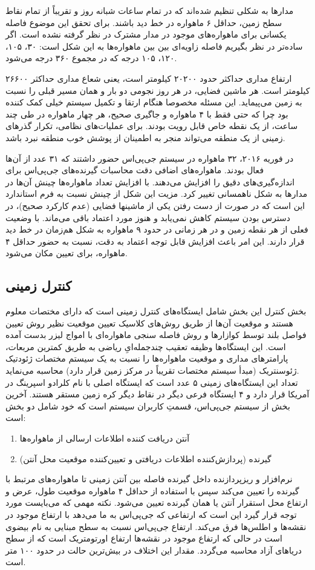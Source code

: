 مدارها به شکلی تنظیم شده‌اند که در تمام ساعات شبانه روز و تقریباً از تمام نقاط سطح زمین، حداقل ۶ ماهواره در خط دید باشند. برای تحقق این موضوع فاصله یکسانی برای ماهواره‌های موجود در مدار مشترک در نظر گرفته نشده‌ است. اگر ساده‌تر در نظر بگیریم فاصله زاویه‌ای بین بین ماهواره‌ها به این شکل است: ۳۰،  ۱۰۵،  ۱۲۰،  ۱۰۵ درجه که در مجموع ۳۶۰ درجه می‌شود.


ارتفاع مداری حداکثر حدود ۲۰۲۰۰ کیلومتر است، یعنی شعاع مداری حداکثر ۲۶۶۰۰ کیلومتر است. هر ماشین فضایی، در هر روز نجومی دو بار و همان مسیر قبلی را نسبت به زمین می‌پیماید. این مسئله مخصوصا هنگام ارتقا و تکمیل سیستم خیلی کمک‌ کننده بود چرا که حتی فقط با ۴ ماهواره و جاگیری صحیح، هر چهار ماهواره در طی چند ساعت، از یک نقطه خاص قابل رویت بودند. برای عملیات‌های نظامی، تکرار گذرهای زمینی از یک منطقه می‌تواند منجر به اطمینان از پوشش خوب منطقه نبرد باشد.


در فوریه ۲۰۱۶، ۳۲ ماهواره در سیستم جی‌پی‌اس حضور داشتند که ۳۱ عدد از آن‌ها فعال بودند. ماهواره‌های اضافی دقت محاسبات گیرنده‌های جی‌پی‌اس برای اندازه‌گیری‌های دقیق را افزایش می‌دهند. با افزایش تعداد ماهواره‌ها چینش آن‌ها در مدارها به شکل ناهمسانی تغییر کرد. مزیت این شکل از چینش نسبت به فرم استاندارد این است که در صورت از دست رفتن یکی از ماشینها فضایی (عدم کارکرد صحیح)، در دسترس بودن سیستم کاهش نمی‌یابد و هنوز مورد اعتماد باقی می‌ماند. با وضعیت فعلی از هر نقطه زمین و در هر زمانی در حدود ۹ ماهواره به شکل هم‌زمان در خط دید قرار دارند. این امر باعث افزایش قابل توجه اعتماد به دقت، نسبت به حضور حداقل ۴ ماهواره، برای تعیین مکان می‌شود.
\subsection{کنترل زمینی}
بخش کنترل این بخش شامل ایستگاه‌های کنترل زمینی است که دارای مختصات معلوم هستند و موقعیت آن‌ها از طریق روش‌های کلاسیک تعیین موقعیت نظیر روش تعیین فواصل بلند توسط کوازارها و روش فاصله سنجی ماهواره‌ای با امواج لیزر بدست آمده ‌است. این ایستگاه‌ها وظیفه تعقیب چندجمله‌ایِ ریاضی به طریق کمترین مربعات، پارامترهای مداری و موقعیت ماهواره‌ها را نسبت به یک سیستم مختصات ژئودتیک ژئوسنتریک (مبدأ سیستم مختصات تقریباً در مرکز زمین قرار دارد) محاسبه می‌نماید.
\\
تعداد این ایستگاه‌های زمینی ۵ عدد است که ایستگاه اصلی با نام کلرادو اسپرینگ در آمریکا قرار دارد و ۴ ایستگاه فرعی دیگر در نقاط دیگر کره زمین مستقر هستند. آخرین بخش از سیستم جی‌پی‌اس، قسمتِ کاربران سیستم است که خود شامل دو بخش است:
\begin{enumerate}
	\item آنتن دریافت ‌کننده اطلاعات ارسالی از ماهواره‌ها
	\item گیرنده (پردازش‌کننده اطلاعات دریافتی و تعیین‌کننده موقعیت محل آنتن)
\end{enumerate}
نرم‌افزار و ریزپردازنده داخل گیرنده فاصله بین آنتن زمینی تا ماهواره‌های مرتبط با گیرنده را تعیین می‌کند سپس با استفاده از حداقل ۴ ماهواره موقعیت طول، عرض و ارتفاع محل استقرار آنتن یا همان گیرنده تعیین می‌شود.
نکته مهمی که می‌بایست مورد توجه قرار گیرد این است که ارتفاعی که جی‌پی‌اس به ما می‌دهد با ارتفاع موجود در نقشه‌ها و اطلس‌ها فرق می‌کند. ارتفاع جی‌پی‌اس نسبت به سطح مبنایی به نام بیضوی است در حالی که ارتفاع موجود در نقشه‌ها ارتفاع اورتومتریک است که از سطح دریاهای آزاد محاسبه می‌گردد. مقدار این اختلاف در بیش‌ترین حالت در حدود ۱۰۰ متر است.
